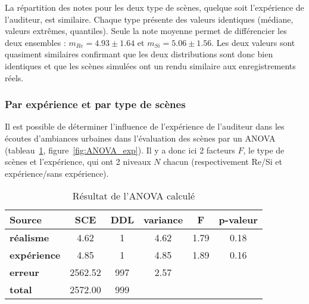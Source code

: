 
La répartition des notes pour les deux type de scènes, quelque soit l'expérience de l'auditeur, est similaire. Chaque type présente des valeurs identiques (médiane, valeurs extrêmes, quantiles). Seule la note moyenne permet de différencier les deux ensembles : $m_{Re} = 4.93 \pm 1.64$ et $m_{Si} = 5.06 \pm 1.56$. Les deux valeurs sont quasiment similaires confirmant que les deux distributions sont donc bien identiques et que les scènes simulées ont un rendu similaire aux enregistrements réels. \\

\subsubsection{Par expérience et par type de scènes}
Il est possible de déterminer l'influence de l'expérience de l'auditeur dans les écoutes d'ambiances urbaines dans l'évaluation des scènes par un ANOVA (tableau~\ref{tab:anova_exp}, figure~\ref{fig:ANOVA_exp}). Il y a donc ici 2 facteurs $F$, le type de scènes et l'expérience, qui ont 2 niveaux $N$ chacun (respectivement Re/Si et expérience/sans expérience).

\begin{table}[ht]
\centering
\begin{tabular}{lccccc}
\hline
\textbf{Source}     & \textbf{SCE} & \textbf{DDL} & \textbf{variance} & \textbf{F} & \textbf{p-valeur} \\
\hline
\textbf{réalisme} & 4.62         & 1            & 4.62              & 1.79       & 0.18              \\
\hline
\textbf{expérience}    & 4.85         & 1            & 4.85              & 1.89       & 0.16              \\
\hline
\textbf{erreur}      & 2562.52      & 997          & 2.57              &            &                   \\
\hline
\textbf{total}      & 2572.00         & 999          &                   &            &       \\
\hline
\end{tabular}
\caption{Résultat de l'ANOVA calculé}
\label{tab:anova_exp}
\end{table}

